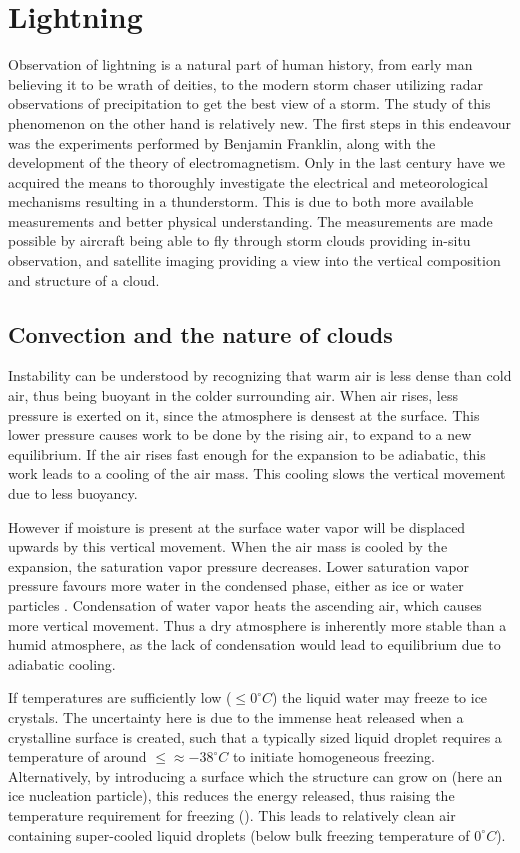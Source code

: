 \setcounter{chapter}{2} 

\chapter{Lightning}
Observation of lightning is a  natural part of human history, from early man believing it to be wrath of deities, to the modern storm chaser utilizing radar observations of precipitation to get the best view of a storm. The study of this phenomenon on the other hand is relatively new. The first steps in this endeavour was the experiments performed by Benjamin Franklin, along with the development of the theory of electromagnetism. Only in the last century have we acquired the means to thoroughly investigate the electrical and meteorological mechanisms resulting in a thunderstorm. This is due to both more available measurements and better physical understanding. The measurements are made possible by aircraft being able to fly through storm clouds providing in-situ observation, and satellite imaging providing a view into the vertical composition and structure of a cloud.

\section{Convection and the nature of clouds}

Instability can be understood by recognizing that warm air is less dense than cold air, thus being buoyant in the colder surrounding air. When air rises, less pressure is exerted on it, since the atmosphere is densest at the surface. This lower pressure causes work to be done by the rising air, to expand to a new equilibrium. If the air rises fast enough for the expansion to be adiabatic, this work leads to a cooling of the air mass. This cooling slows the vertical movement due to less buoyancy.

However if moisture is present at the surface water vapor will be displaced upwards by this vertical movement. When the air mass is cooled by the expansion, the saturation vapor pressure decreases. Lower saturation vapor pressure favours more water in the condensed phase, either as ice or water particles . Condensation of water vapor heats the ascending air, which causes more vertical movement. Thus a dry atmosphere is inherently more stable than a humid atmosphere, as the lack of condensation would lead to equilibrium due to adiabatic cooling.

If temperatures are sufficiently low ($\leq 0 ^{\circ} C$) the liquid water may freeze to ice crystals. The uncertainty here is due to the immense heat released when a crystalline surface is created, such that a typically sized liquid droplet requires a temperature of around $\leq \approx-38 ^{\circ} C$ to initiate homogeneous freezing. Alternatively, by introducing a surface which the structure can grow on (here an ice nucleation particle), this reduces the energy released, thus raising the temperature requirement for freezing (\cite{jeffery1997}). This leads to relatively clean air containing super-cooled liquid droplets (below bulk freezing temperature of $0 ^{\circ} C$).

